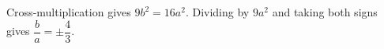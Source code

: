 Cross-multiplication gives $9b^2=16a^2$. Dividing by $9a^2$ and taking both signs gives $\boxed{\dfrac{b}{a}=\pm\dfrac{4}{3}}$.
